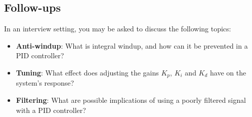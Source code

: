 \documentclass[main.tex]{subfiles}
\begin{document}
\subsection{Follow-ups}
In an interview setting, you may be asked to discuss the following topics:
\begin{itemize}
    \item \textbf{Anti-windup}: What is integral windup, and how can it be prevented in a PID controller?
    \item \textbf{Tuning}: What effect does adjusting the gains $K_p$, $K_i$ and $K_d$ have on the system's response?
    \item \textbf{Filtering}: What are possible implications of using a poorly filtered signal with a PID controller?
\end{itemize}
\end{document}
